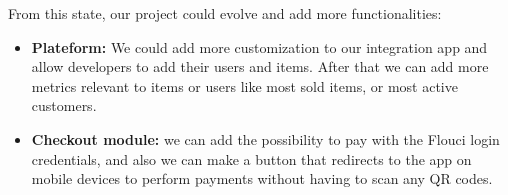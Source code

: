 \begin{spacing}{1.2}
From this state, our project could evolve and add more functionalities:
\begin{itemize}
	\item \textbf{Plateform:} We could add more customization to our integration app and allow developers to add their users and items. After that we can add more metrics relevant to items or users like most sold items, or most active customers.
	\item \textbf{Checkout module:} we can add the possibility to pay with the Flouci login credentials, and also we can make a button that redirects to the app on mobile devices to perform payments without having to scan any QR codes.
\end{itemize} 

\end{spacing}